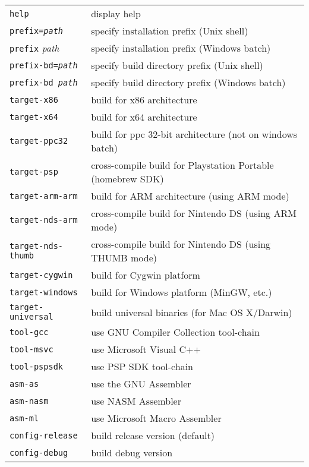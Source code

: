 \begin{enumerate}
\begin{tabular}{ll}	
{\tt help}                 & display help \\
{\tt prefix={\it path}}    & specify installation prefix (Unix shell) \\
{\tt prefix} {\it path}    & specify installation prefix (Windows batch) \\
{\tt prefix-bd={\it path}} & specify build directory prefix (Unix shell) \\
{\tt prefix-bd {\it path}} & specify build directory prefix (Windows batch) \\
{\tt target-x86}           & build for x86 architecture \\
{\tt target-x64}           & build for x64 architecture \\
{\tt target-ppc32}         & build for ppc 32-bit architecture (not on windows batch)\\
{\tt target-psp}           & cross-compile build for Playstation Portable (homebrew SDK)\\
{\tt target-arm-arm}       & build for ARM architecture (using ARM mode) \\
{\tt target-nds-arm}       & cross-compile build for Nintendo DS (using ARM mode) \\
{\tt target-nds-thumb}     & cross-compile build for Nintendo DS (using THUMB mode) \\
{\tt target-cygwin}        & build for Cygwin platform \\
{\tt target-windows}       & build for Windows platform (MinGW, etc.) \\
{\tt target-universal}     & build universal binaries (for Mac OS X/Darwin) \\
{\tt tool-gcc}             & use GNU Compiler Collection tool-chain \\
{\tt tool-msvc}            & use Microsoft Visual C++ \\
{\tt tool-pspsdk}          & use PSP SDK tool-chain \\
{\tt asm-as}               & use the GNU Assembler \\
{\tt asm-nasm}             & use NASM Assembler \\
{\tt asm-ml}               & use Microsoft Macro Assembler \\
{\tt config-release}       & build release version (default) \\
{\tt config-debug}         & build debug version \\
\end{tabular}


\end{enumerate}
